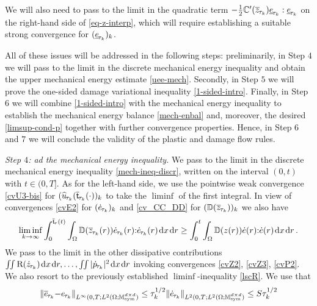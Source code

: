 \documentclass[a4paper,10pt,reqno]{amsart}
\numberwithin{equation}{section}
\newcommand{\bbM}{\mathbb{M}}
\numberwithin{equation}{section}
\def\dd{\;\!\mathrm{d}} %
\newcommand{\pairing}[4]{ \sideset{_{ #1 }}{_{ #2 }}  {\mathop{\langle #3 , #4
\rangle}}}
\newcommand{\piecewiseConstant}[2]{\overline{#1}_{\kern-1pt#2}}
\newcommand{\pwc}{\piecewiseConstant}
\newcommand{\upiecewiseConstant}[2]{\underline{#1}_{\kern-1pt#2}}
\newcommand{\upwc}{\upiecewiseConstant}
\newcommand{\piecewiseLinear}[2]{{#1}_{\kern-1pt#2}}
\newcommand{\pwl}{\piecewiseLinear}
\newcommand{\pwwll}[2]{\widehat{#1}_{\kern-1pt#2}}
\newcommand{\bbC}{\mathbb{C}}
\newcommand{\bbD}{\mathbb{D}}
\newcommand{\mt}{\bbM}
\newcommand{\sym}{\mathrm{sym}}
\newcommand{\did}[1]{\mathrm{R}(#1)}
\newcommand{\spz}{H^{\mathrm{s}}(\Omega)}
\begin{document}
We will also need to pass to the limit in the quadratic term $ -\tfrac12 \bbC'(\pwc z{\tau_k}) \upwc e{\tau_k} :  \upwc e{\tau_k} $ on the right-hand side
 of \eqref{eq-z-interp}, which will require establishing a suitable strong convergence for $(
 \upwc e{\tau_k} )_k$. 
 \par
 All of  these issues  will be addressed in the following steps: preliminarily, in Step $4$  we will pass to the limit in the discrete mechanical energy inequality and obtain the  upper mechanical energy estimate \eqref{uee-mech}. 
 Secondly, in Step $5$ we will prove the one-sided damage variational inequality \eqref{1-sided-intro}. 
  Finally, in Step $6$
 we will combine \eqref{1-sided-intro} with the mechanical energy inequality to establish 
 the mechanical energy balance \eqref{mech-enbal} and, moreover, the desired 
  \eqref{limsup-cond-p} %
   together with further convergence properties. 
  Hence, in Step $6$ and $7$ we will conclude the validity of the plastic and damage flow rules. 
 \par
 \noindent 
 \emph{Step $4$: ad the mechanical energy inequality.}
 We pass to the limit in  the discrete mechanical energy inequality \eqref{mech-ineq-discr}, written on the interval $(0,t)$ with
 $t \in (0,T]$.  As for the left-hand side, we use the pointwise weak convergence \eqref{cvU3-bis} for 
 $(\pwwll{u}{\tau_k}(\pwc {\mathsf{t}}{\tau_k}(\cdot))_k$ to take the $\liminf$ of   the first integral.
In view of convergences \eqref{cvE2}
 for $(\pwl {\dot e}{\tau_k})_k$
 and \eqref{cv_CC_DD}  for $(\bbD(\pwc z{\tau_k}))_k$ we also have 
 \[
 \liminf_{k\to\infty} \int_{0}^{\pwc{\mathsf{t}}{\tau}(t)} \int_\Omega
 \bbD(\pwc z{\tau_k}(r)) \pwl{\dot e}{\tau_k}(r) {:} \pwl{\dot e}{\tau_k}(r)  \dd x \dd r \geq 
 \int_0^t \int_\Omega \bbD(z(r)) \dot{e}(r) {:} \dot{e}(r) \dd x \dd r\,.
 \]
 We pass to the limit in the other dissipative contributions $\iint \did{\pwl{\dot z}{\tau_k}} \dd x \dd r, \ldots ,
 \iint |\pwl{\dot p}{\tau_k}|^2 \dd x \dd r$ invoking convergences \eqref{cvZ2}, \eqref{cvZ3}, \eqref{cvP2}. We also resort
   to the previously established  $\liminf$-inequality \eqref{lscR}.
  We use that 
  \begin{equation}
  \label{stability-e}
  \| \pwc e{\tau_k} {-}  \pwl e{\tau_k}\|_{L^\infty(0,T; L^2(\Omega;\mt_\sym^{d\times d})}\leq 
  \tau_k^{1/2} \|  \pwl {\dot e}{\tau_k}\|_{L^2(0,T; L^2(\Omega;\mt_\sym^{d\times d})} \leq S \tau_k^{1/2}
  \end{equation}
\end{document}

